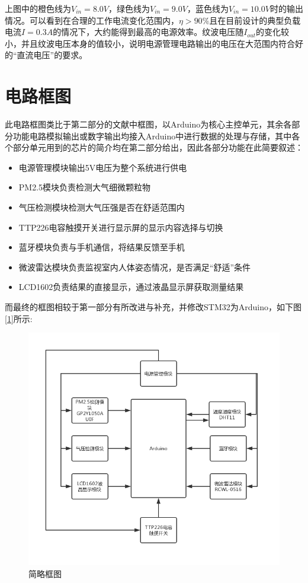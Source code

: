 \documentclass[a4paper, 11pt]{article} %
\begin{document}
上图中的橙色线为$V_{in} = 8.0V$，绿色线为$V_{in} = 9.0V$，蓝色线为$V_{in} = 10.0V$时的输出情况。可以看到在合理的工作电流变化范围内，$\eta > 90\%$且在目前设计的典型负载电流$I = 0.3A$的情况下，大约能得到最高的电源效率。纹波电压随$I_{out}$的变化较小，并且纹波电压本身的值较小，说明电源管理电路输出的电压在大范围内符合好的“直流电压”的要求。

\section{电路框图}
\par{} 此电路框图类比于第二部分的文献中框图，以Arduino为核心主控单元，其余各部分功能电路模拟输出或数字输出均接入Arduino中进行数据的处理与存储，其中各个部分单元用到的芯片的简介均在第二部分给出，因此各部分功能在此简要叙述：
\begin{itemize}
\item 电源管理模块输出5V电压为整个系统进行供电
\item PM2.5模块负责检测大气细微颗粒物
\item 气压检测模块检测大气压强是否在舒适范围内
\item TTP226电容触摸开关进行显示屏的显示内容选择与切换
\item 蓝牙模块负责与手机通信，将结果反馈至手机
\item 微波雷达模块负责监视室内人体姿态情况，是否满足“舒适”条件
\item LCD1602负责结果的直接显示，通过液晶显示屏获取测量结果


\end{itemize}
\par{} 而最终的框图相较于第一部分有所改进与补充，并修改STM32为Arduino，如下图[\ref{img6}]所示:



\begin{figure}[H]
  \centering
  \includegraphics[scale = 0.45 ]{1-n.png}
  \caption{简略框图}
  \label{img6} 
\end{figure}
\end{document}
